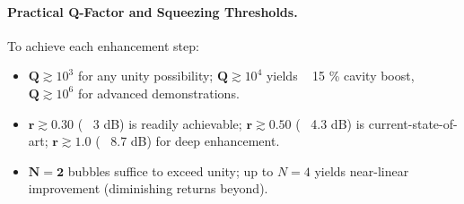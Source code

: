 \documentclass{article}
\begin{document}
\paragraph{Practical Q-Factor and Squeezing Thresholds.}
To achieve each enhancement step:
\begin{itemize}
  \item \(\mathbf{Q}\gtrsim10^3\) for any unity possibility; \(\mathbf{Q}\gtrsim10^4\) yields ~ 15 \% cavity boost, \(\mathbf{Q}\gtrsim10^6\) for advanced demonstrations.  
  \item \(\mathbf{r}\gtrsim0.30\) (~ 3 dB) is readily achievable; \(\mathbf{r}\gtrsim0.50\) (~ 4.3 dB) is current-state-of-art; \(\mathbf{r}\gtrsim1.0\) (~ 8.7 dB) for deep enhancement.  
  \item \(\mathbf{N=2}\) bubbles suffice to exceed unity; up to \(N=4\) yields near-linear improvement (diminishing returns beyond).  
\end{itemize}
\end{document}
